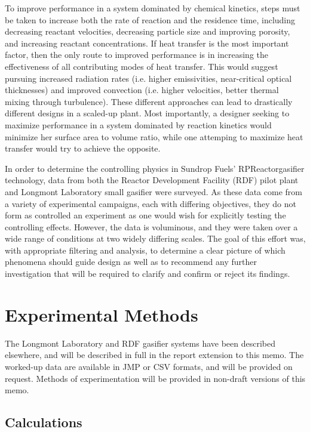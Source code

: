 \documentclass[11pt,twocolumn]{article}
\begin{document}
To improve performance in a system dominated by chemical kinetics, steps must be taken to increase both the rate of reaction and the residence time, including decreasing reactant velocities, decreasing particle size and improving porosity, and increasing reactant concentrations.  If heat transfer is the most important factor, then the only route to improved performance is in increasing the effectiveness of all contributing modes of heat transfer.  This would suggest pursuing increased radiation rates (i.e. higher emissivities, near-critical optical thicknesses) and improved convection (i.e. higher velocities, better thermal mixing through turbulence).  These different approaches can lead to drastically different designs in a scaled-up plant.  Most importantly, a designer seeking to maximize performance in a system dominated by reaction kinetics would minimize her surface area to volume ratio, while one attemping to maximize heat transfer would try to achieve the opposite.

In order to determine the controlling physics in Sundrop Fuels' RPReactor\texttrademark gasifier technology, data from both the Reactor Development Facility (RDF) pilot plant and Longmont Laboratory small gasifier were surveyed.  As these data come from a variety of experimental campaigns, each with differing objectives, they do not form as controlled an experiment as one would wish for explicitly testing the controlling effects.  However, the data is voluminous, and they were taken over a wide range of conditions at two widely differing scales.  The goal of this effort was, with appropriate filtering and analysis, to determine a clear picture of which phenomena should guide design as well as to recommend any further investigation that will be required to clarify and confirm or reject its findings.

\section*{Experimental Methods}

The Longmont Laboratory and RDF gasifier systems have been described elsewhere, and will be described in full in the report extension to this memo.  The worked-up data are available in JMP or CSV formats, and will be provided on request.  Methods of experimentation will be provided in non-draft versions of this memo.

\subsection*{Calculations}
\end{document}
